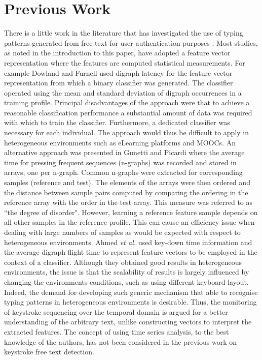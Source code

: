 \documentclass[runningheads,a4paper]{llncs}
\begin{document}

\section{Previous Work} \label{sec:previousWork}
There is a little work in the literature that has investigated the use of typing patterns generated from free text for user authentication purposes \cite{ahmed2014biometric}. Most studies, as noted in the introduction to this paper, have adopted a feature vector representation where the features are computed statistical measurements. For example
Dowland and Furnell \cite{dowland2004long} used digraph latency for the feature vector representation from which a binary classifier was generated. The classifier operated using the mean and standard deviation of digraph occurrences in a training profile. Principal disadvantages of the approach were that to achieve a reasonable classification performance a substantial amount of data was required with which to train the classifier. Furthermore, a dedicated classifier was necessary for each individual. The approach would thus be difficult to apply in heterogeneous environments such as eLearning platforms and MOOCs. An alternative approach was presented in Gunetti and Picardi \cite{gunetti2005keystroke} where the average time for pressing frequent sequences (n-graphs) was recorded and stored in arrays, one per n-graph. Common n-graphs were extracted for corresponding samples (reference and test). The elements of the arrays were then ordered and the distance between sample pairs computed by comparing the ordering in the reference array with the order in the test array. This measure was referred to as ``the degree of disorder". However, learning a reference feature sample depends on all other samples in the reference profile. This can cause an efficiency issue when dealing with large numbers of samples as would be expected with respect to heterogeneous environments. 
Ahmed \textit{et al.} \cite{ahmed2014biometric} used key-down time information and the average digraph flight time to represent feature vectors to be employed in the context of a classifier. Although they obtained good results in heterogeneous environments, the issue is that the scalability of results is largely influenced by changing the environments conditions, such as using different keyboard layout. 
Indeed, the demand for developing such generic mechanism that able to recognise typing patterns in heterogeneous environments is desirable. Thus, the monitoring of keystroke sequencing over the temporal domain is argued for a better understanding of the arbitrary text, unlike constructing vectors to interpret the extracted features. The concept of using time series analysis, to the best knowledge of the authors, has not been considered in the previous work on keystroke free text detection.
\end{document}
